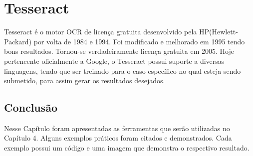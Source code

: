 \section{Tesseract}

Tesseract é o motor OCR de licença gratuita desenvolvido pela HP(Hewlett-Packard) \cite{Hewlett-Packard} por volta de 1984 e 1994. Foi modificado e melhorado em 1995 tendo bons resultados. Tornou-se verdadeiramente licença gratuita em 2005. Hoje pertencente oficialmente a Google, o Tesseract possui suporte a diversas linguagens, tendo que ser treinado para o caso específico no qual esteja sendo submetido, para assim gerar os resultados desejados\cite{patel2012optical}.

\subsection{Conclusão}

Nesse Capítulo foram apresentadas as ferramentas que serão utilizadas no Capítulo 4. Alguns exemplos práticos foram citados e demonstrados. Cada exemplo possui um código e uma imagem que demonstra o respectivo resultado.
